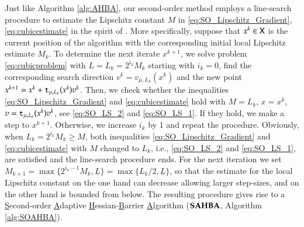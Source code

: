 Just like Algorithm \ref{alg:AHBA}, our second-order method employs a line-search procedure to estimate the Lipschitz constant $M$ in \eqref{eq:SO_Lipschitz_Gradient}, \eqref{eq:cubicestimate} in the spirit of \cite{NesPol06,CarGouToi12}. More specifically, suppose that $x^{k}\in\mathsf{X}$ is the current position of the algorithm with the corresponding initial local Lipschitz estimate $M_{k}$. To determine the next iterate $x^{k+1}$, we solve problem \eqref{eq:cubicproblem} with $L= L_k = 2^{i_k}M_{k}$ starting with $ i_k =0$, find the corresponding search direction $v^{k}=v_{\mu,L_{k}}(x^{k})$ and the new point $x^{k+1} = x^{k} + \mathtt{t}_{\mu, L_{k}}(x^{k})v^{k}$. 
Then, we check whether the inequalities \eqref{eq:SO_Lipschitz_Gradient} and \eqref{eq:cubicestimate} hold with  $M=L_{k}$, $x=x^{k}$, $v = \mathtt{t}_{\mu, L_{k}}(x^{k})v^{k}$, see \eqref{eq:SO_LS_2} and \eqref{eq:SO_LS_1}. 
If they hold, we make a step to $x^{k+1}$. 
Otherwise, we increase $i_k$ by 1 and repeat the procedure. Obviously, when $L_{k} = 2^{i_k}M_k \geq M$, both inequalities \eqref{eq:SO_Lipschitz_Gradient} and \eqref{eq:cubicestimate} with $M$ changed to $L_k$, i.e., \eqref{eq:SO_LS_2} and \eqref{eq:SO_LS_1}, are satisfied and the line-search procedure ends. For the next iteration we set $M_{k+1} = \max\{2^{i_k-1}M_{k},\underline{L}\}=\max\{L_{k}/2,\underline{L}\}$, so that the estimate for the local Lipschitz constant on the one hand can decrease allowing larger step-sizes, and on the other hand is bounded from below. 
The resulting procedure gives rise to a \underline{S}econd-order \underline{A}daptive \underline{H}essian-\underline{B}arrier \underline{A}lgorithm ($\operatorname{\mathbf{SAHBA}}$, Algorithm \ref{alg:SOAHBA}).
